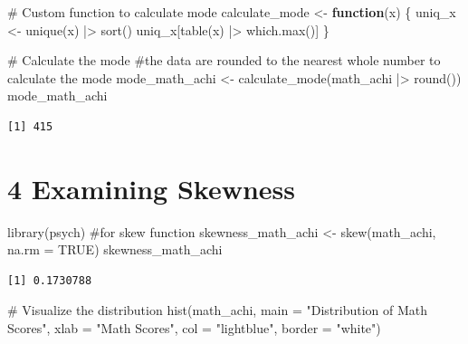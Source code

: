 \documentclass[
  letterpaper,
  DIV=11,
  numbers=noendperiod]{scrreprt}
\newenvironment{Shaded}{\begin{snugshade}}{\end{snugshade}}
\newcommand{\AttributeTok}[1]{\textcolor[rgb]{0.40,0.45,0.13}{#1}}
\newcommand{\CommentTok}[1]{\textcolor[rgb]{0.37,0.37,0.37}{#1}}
\newcommand{\ConstantTok}[1]{\textcolor[rgb]{0.56,0.35,0.01}{#1}}
\newcommand{\ControlFlowTok}[1]{\textcolor[rgb]{0.00,0.23,0.31}{\textbf{#1}}}
\newcommand{\FunctionTok}[1]{\textcolor[rgb]{0.28,0.35,0.67}{#1}}
\newcommand{\NormalTok}[1]{\textcolor[rgb]{0.00,0.23,0.31}{#1}}
\newcommand{\OtherTok}[1]{\textcolor[rgb]{0.00,0.23,0.31}{#1}}
\newcommand{\SpecialCharTok}[1]{\textcolor[rgb]{0.37,0.37,0.37}{#1}}
\newcommand{\StringTok}[1]{\textcolor[rgb]{0.13,0.47,0.30}{#1}}
\begin{document}
\begin{Shaded}
\begin{Highlighting}[]
\CommentTok{\# Custom function to calculate mode }
\NormalTok{calculate\_mode }\OtherTok{\textless{}{-}} \ControlFlowTok{function}\NormalTok{(x) \{ }
\NormalTok{  uniq\_x }\OtherTok{\textless{}{-}} \FunctionTok{unique}\NormalTok{(x) }\SpecialCharTok{|\textgreater{}} \FunctionTok{sort}\NormalTok{() }
\NormalTok{  uniq\_x[}\FunctionTok{table}\NormalTok{(x) }\SpecialCharTok{|\textgreater{}} \FunctionTok{which.max}\NormalTok{()] }
\NormalTok{\} }
 
\CommentTok{\# Calculate the mode }
\CommentTok{\#the data are rounded to the nearest whole number to calculate the mode }
\NormalTok{mode\_math\_achi }\OtherTok{\textless{}{-}} \FunctionTok{calculate\_mode}\NormalTok{(math\_achi }\SpecialCharTok{|\textgreater{}} \FunctionTok{round}\NormalTok{()) }
\NormalTok{mode\_math\_achi }
\end{Highlighting}
\end{Shaded}

\begin{verbatim}
[1] 415
\end{verbatim}

\section*{4 Examining Skewness}\label{examining-skewness}


\begin{Shaded}
\begin{Highlighting}[]
\FunctionTok{library}\NormalTok{(psych) }\CommentTok{\#for skew function }
\NormalTok{skewness\_math\_achi }\OtherTok{\textless{}{-}} \FunctionTok{skew}\NormalTok{(math\_achi, }\AttributeTok{na.rm =} \ConstantTok{TRUE}\NormalTok{) }
\NormalTok{skewness\_math\_achi }
\end{Highlighting}
\end{Shaded}

\begin{verbatim}
[1] 0.1730788
\end{verbatim}

\begin{Shaded}
\begin{Highlighting}[]
\CommentTok{\# Visualize the distribution }
\FunctionTok{hist}\NormalTok{(math\_achi, }\AttributeTok{main =} \StringTok{"Distribution of Math Scores"}\NormalTok{, }\AttributeTok{xlab =} \StringTok{"Math Scores"}\NormalTok{,  }
     \AttributeTok{col =} \StringTok{"lightblue"}\NormalTok{, }\AttributeTok{border =} \StringTok{"white"}\NormalTok{) }
\end{Highlighting}
\end{Shaded}
\end{document}
